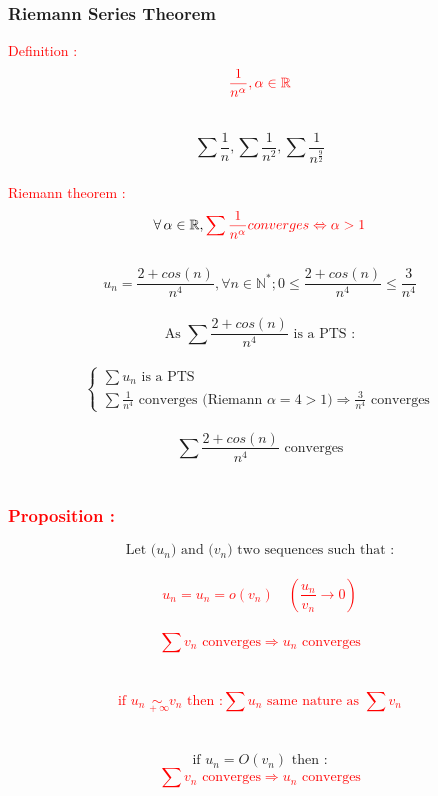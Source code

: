 \documentclass[a4paper,12pt]{article}
\begin{document}
\subsubsection*{Riemann Series Theorem}

\textcolor{red}{Definition :} \\

\[
\textcolor{red}{\frac{1}{n^\alpha}, \alpha \in \mathbb{R}}
\]

 \\
\[
    \sum \frac{1}{n} , \sum \frac{1}{n^2}, \sum \frac{1}{n^\frac{9}{2}}
\] 
\\

\textcolor{red}{Riemann theorem :}\\
\[
\forall \,\alpha \in \mathbb{R}, \textcolor{red}{\sum{\frac{1}{n^\alpha}}} \textcolor{red}{   converges \Leftrightarrow \alpha > 1} 
\]
\\
\[
    u_n = \frac{2 + cos(n)}{n^4}, \forall n\in \mathbb{N^*}; 0 \leq \frac{2 + cos(n)}{n^4}\leq \frac{3}{n^4}
\] \\

\[
\text{As } \sum \frac{2 + cos(n)}{n^4} \text { is a PTS :}
\] \\

\[
\begin{cases}
    \sum u_n \text{ is a PTS}\\
    \sum \frac{1}{n^4} \text{ converges (Riemann } \alpha = 4 > 1\text{)} \Rightarrow \frac{3}{n^4} \text{ converges}
\end{cases}
\] \\

 \[
\sum \frac{2 + cos(n)}{n^4} \text{ converges}
\] 
\\
\textcolor{red}{\subsubsection*{Proposition :}}
{\textcolor{red}{}}
\[
\text{Let (} u_n \text{) and (} v_n\text{) two sequences such that :}
\] \\
\textcolor{red}{\[
u_n = u_n = o(v_n) \quad(\frac{u_n}{v_n} \to 0) 
\]}\\
\textcolor{red}{\[
\sum v_n \text{ converges} \Rightarrow u_n \text { converges}
\]}\\
{\textcolor{red}{}}\\
\textcolor{red}{\[\text{if } u_n \underset{\, +\infty}{\sim} v_n \text{ then :} \sum u_n \text{ same nature as } \sum v_n
\] }\\
{\textcolor{red}{}}\\
\[
\text{if } u_n = O(v_n) \text{ then :}
\] 
\textcolor{red}{\[
\sum v_n \text{ converges} \Rightarrow u_n \text { converges}
\] }\\
{}\\
\end{document}

